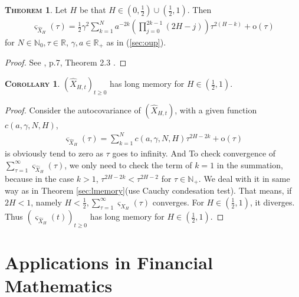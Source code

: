 \documentclass[a4paper, twoside, 11pt]{article}
\theoremstyle{definition}
\newtheorem{theorem}[definition]{\scshape Theorem}
\newtheorem{corollary}[definition]{\scshape Corollary}
\newcommand{\brkt}[1]{\left({#1} \right)}
\begin{document}
\begin{theorem}
  Let $H$ be that $H\in (0, \frac{1}{2}) \cup (\frac{1}{2}, 1)$. Then
  \begin{eqnarray*}
	\varsigma_{\hat{X}_{H}}(\tau) = \frac{1}{2} \gamma^2 \sum_{k=1}^{N} a^{-2k}\brkt{\prod_{j=0}^{2k-1}(2H-j)}\tau^{2(H-k)} + \mathrm{o}(\tau)
\end{eqnarray*}
for $N \in \mathbb{N}_{0}, \tau\in\mathbb{R}$, $\gamma, a \in \mathbb{R}_+$ as in (\ref{sec:oup}).
  \label{sec:autocov}
\end{theorem}
\begin{proof}
  See \cite{chriel}, p.7, Theorem 2.3 .
\end{proof}

\begin{corollary}
  $(\hat{X}_{H,t})_{t\ge 0}$ has long memory for $H\in (\frac{1}{2}, 1)$.
  \label{sec:longmer}
\end{corollary}
\begin{proof}
  Consider the autocovariance of $(\hat{X}_{H,t})$, with a given function $c(a, \gamma, N, H)$,
  \begin{eqnarray*}
	\varsigma_{\hat{X}_{H}}(\tau) = \sum_{k=1}^N c(a, \gamma, N, H) \tau^{2H-2k} + \mathrm{o}(\tau)
  \end{eqnarray*}
  is obviously tend to zero as $\tau$ goes to infinity. And To check convergence of $\sum_{\tau=1}^{\infty} \varsigma_{\hat{X}_{H}}(\tau)$, we only need to check the term of $k=1$ in the summation, because in the case $k>1$, $\tau^{2H-2k} < \tau^{2H-2}$ for $\tau\in\mathbb{N}_{+}$. We deal with it in same way as in Theorem \ref{sec:lmemory}(use Cauchy condesation test). That means, if $2H < 1$, namely $H<\frac{1}{2}, \sum_{\tau=1}^{\infty} \varsigma_{X_{H}}(\tau)$ converges. For $H\in (\frac{1}{2}, 1)$, it diverges. Thus $(\varsigma_{\hat{X}_{H}}(t))_{t\ge 0}$ has long memory for $H\in(\frac{1}{2}, 1)$.
\end{proof}
\newpage

\section{Applications in Financial Mathematics}
\setcounter{equation}{0}
\end{document}

